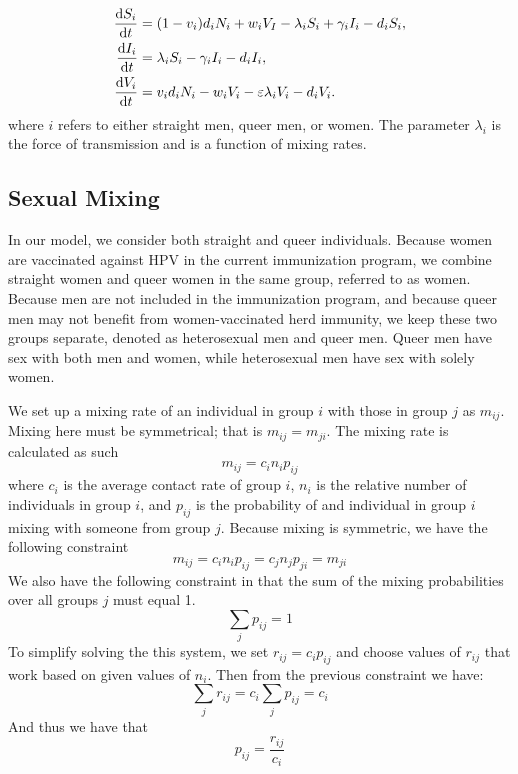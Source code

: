 \documentclass[12pt]{article}
\begin{document}
\begin{align}
\frac{\mathrm{d}S_i}{\mathrm{d}t}&=(1-v_i)d_iN_i + w_iV_I - \lambda_iS_i + \gamma_iI_i - d_iS_i,\\
\frac{\mathrm{d}I_i}{\mathrm{d}t}&= \lambda_iS_i - \gamma_iI_i- d_iI_i,\\
\frac{\mathrm{d}V_i}{\mathrm{d}t}&= v_id_iN_i - w_iV_i - \varepsilon \lambda_iV_i - d_iV_i.
\end{align}
where $i$ refers to either straight men, queer men, or women.  The parameter $\lambda_i$ is the force of transmission and is a function of mixing rates.  

\subsection*{Sexual Mixing}

In our model, we consider both straight and queer individuals.  Because women are vaccinated against HPV in the current immunization program, we combine straight women and queer women in the same group, referred to as women.  Because men are not included in the immunization program, and because queer men may not benefit from women-vaccinated herd immunity, we keep these two groups separate, denoted as heterosexual men and queer men.  Queer men have sex with both men and women, while heterosexual men have sex with solely women.  

We set up a mixing rate of an individual in group $i$ with those in group $j$ as $m_{ij}$.  Mixing here must be symmetrical; that is $m_{ij}=m_{ji}$.  The mixing rate is calculated as such
\begin{equation}
m_{ij} = c_i n_i p_{ij}
\end{equation}
where $c_i$ is the average contact rate of group $i$, $n_i$ is the relative number of individuals in group $i$, and $p_{ij}$ is the probability of and individual in group $i$ mixing with someone from group $j$.  Because mixing is symmetric, we have the following constraint
\begin{equation}
m_{ij} = c_i n_i p_{ij} = c_j n_j p_{ji} = m_{ji}
\end{equation}
We also have the following constraint in that the sum of the mixing probabilities over all groups $j$ must equal 1. 
\begin{equation}
\sum_j p_{ij} = 1
\end{equation}
To simplify solving the this system, we set $r_{ij}=c_ip_{ij}$ and choose values of $r_{ij}$ that work based on given values of $n_i$.  Then from the previous constraint we have:
\begin{equation}\label{eq:ContRateEq}
\sum_j r_{ij} = c_i \sum_j p_{ij} = c_i
\end{equation}
And thus we have that 
\begin{equation}\label{eq:ProbEq}
p_{ij}=\frac{r_{ij}}{c_i}
\end{equation}
\end{document}

